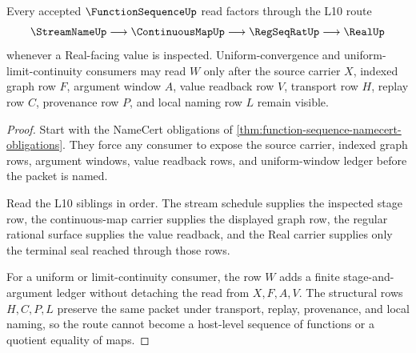 \begin{theorem}
\label{thm:function-sequence-l10-route}
Every accepted $\FunctionSequenceUp$ read factors through the L10 route
$$
\StreamNameUp \longrightarrow \ContinuousMapUp \longrightarrow \RegSeqRatUp \longrightarrow \RealUp
$$
whenever a Real-facing value is inspected. Uniform-convergence and uniform-limit-continuity consumers may read $W$ only after the source carrier $X$, indexed graph row $F$, argument window $A$, value readback row $V$, transport row $H$, replay row $C$, provenance row $P$, and local naming row $L$ remain visible.
\end{theorem}
\begin{proof}
Start with the NameCert obligations of \autoref{thm:function-sequence-namecert-obligations}. They force any consumer to expose the source carrier, indexed graph rows, argument windows, value readback rows, and uniform-window ledger before the packet is named.

Read the L10 siblings in order. The stream schedule supplies the inspected stage row, the continuous-map carrier supplies the displayed graph row, the regular rational surface supplies the value readback, and the Real carrier supplies only the terminal seal reached through those rows.

For a uniform or limit-continuity consumer, the row $W$ adds a finite stage-and-argument ledger without detaching the read from $X,F,A,V$. The structural rows $H,C,P,L$ preserve the same packet under transport, replay, provenance, and local naming, so the route cannot become a host-level sequence of functions or a quotient equality of maps.
\end{proof}



